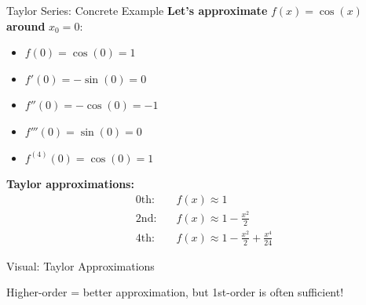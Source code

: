 \documentclass[usenames,dvipsnames]{beamer}
\begin{document}
  \begin{frame}{Taylor Series: Concrete Example}
    \textbf{Let's approximate} $f(x) = \cos(x)$ \textbf{around} $x_0 = 0$:
    
    \begin{itemize}[<+->]
        \item $f(0) = \cos(0) = 1$
        \item $f'(0) = -\sin(0) = 0$  
        \item $f''(0) = -\cos(0) = -1$
        \item $f'''(0) = \sin(0) = 0$
        \item $f^{(4)}(0) = \cos(0) = 1$
    \end{itemize}
    
    \pause
    \textbf{Taylor approximations:}
    \begin{align}
        \text{0th:} \quad &f(x) \approx 1\\
        \text{2nd:} \quad &f(x) \approx 1 - \frac{x^2}{2}\\
        \text{4th:} \quad &f(x) \approx 1 - \frac{x^2}{2} + \frac{x^4}{24}
    \end{align}
  \end{frame}

  \begin{frame}{Visual: Taylor Approximations}
    \begin{center}
    \end{center}
    
    \begin{keypointsbox}
    Higher-order = better approximation, but 1st-order is often sufficient!
    \end{keypointsbox}
  \end{frame}
\end{document}
